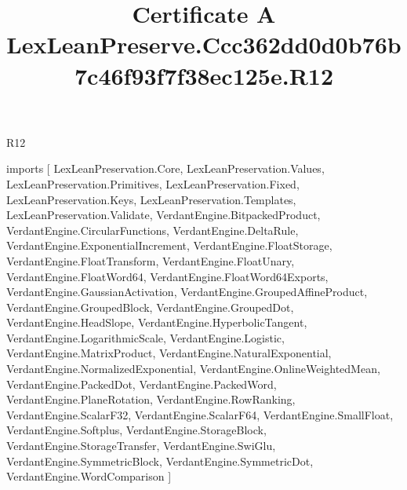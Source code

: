 \begin{lexlean}{R12}
\title{Certificate A LexLeanPreserve.Ccc362dd0d0b76b7c46f93f7f38ec125e.R12}
\begin{coremodule}
imports [
  LexLeanPreservation.Core,
  LexLeanPreservation.Values,
  LexLeanPreservation.Primitives,
  LexLeanPreservation.Fixed,
  LexLeanPreservation.Keys,
  LexLeanPreservation.Templates,
  LexLeanPreservation.Validate,
  VerdantEngine.BitpackedProduct,
  VerdantEngine.CircularFunctions,
  VerdantEngine.DeltaRule,
  VerdantEngine.ExponentialIncrement,
  VerdantEngine.FloatStorage,
  VerdantEngine.FloatTransform,
  VerdantEngine.FloatUnary,
  VerdantEngine.FloatWord64,
  VerdantEngine.FloatWord64Exports,
  VerdantEngine.GaussianActivation,
  VerdantEngine.GroupedAffineProduct,
  VerdantEngine.GroupedBlock,
  VerdantEngine.GroupedDot,
  VerdantEngine.HeadSlope,
  VerdantEngine.HyperbolicTangent,
  VerdantEngine.LogarithmicScale,
  VerdantEngine.Logistic,
  VerdantEngine.MatrixProduct,
  VerdantEngine.NaturalExponential,
  VerdantEngine.NormalizedExponential,
  VerdantEngine.OnlineWeightedMean,
  VerdantEngine.PackedDot,
  VerdantEngine.PackedWord,
  VerdantEngine.PlaneRotation,
  VerdantEngine.RowRanking,
  VerdantEngine.ScalarF32,
  VerdantEngine.ScalarF64,
  VerdantEngine.SmallFloat,
  VerdantEngine.Softplus,
  VerdantEngine.StorageBlock,
  VerdantEngine.StorageTransfer,
  VerdantEngine.SwiGlu,
  VerdantEngine.SymmetricBlock,
  VerdantEngine.SymmetricDot,
  VerdantEngine.WordComparison
]


\end{coremodule}
\end{lexlean}
